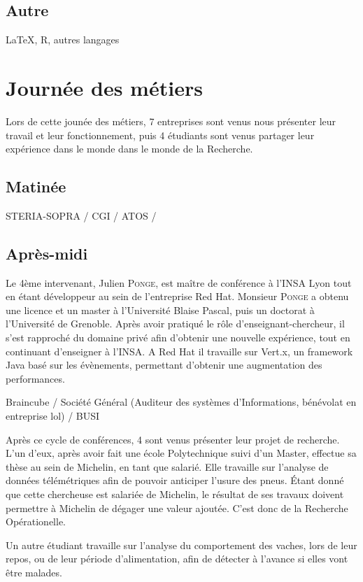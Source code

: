 \documentclass[14pt, a4paper]{report}
\begin{document}
  \section{Autre}

  \LaTeX , R, autres langages

\chapter{Journée des métiers}



Lors de cette jounée des métiers, 7 entreprises sont venus nous présenter leur travail et leur fonctionnement, puis 4 étudiants sont venus partager leur expérience dans le monde dans le monde de la Recherche.

\section{Matinée}

STERIA-SOPRA / CGI / ATOS / 

\section{Après-midi}

Le 4ème intervenant, Julien \textsc{Ponge}, est maître de conférence à l'INSA Lyon tout en étant développeur au sein de l'entreprise Red Hat. Monsieur \textsc{Ponge} a obtenu une licence et un master à l'Université Blaise Pascal, puis un doctorat à l'Université de Grenoble. Après avoir pratiqué le rôle d'enseignant-chercheur, il s'est rapproché du domaine privé afin d'obtenir une nouvelle expérience, tout en continuant d'enseigner à l'INSA. A Red Hat il travaille sur Vert.x, un framework Java basé sur les évènements, permettant d'obtenir une augmentation des performances.


Braincube / Société Général (Auditeur des systèmes d'Informations, bénévolat en entreprise lol) / BUSI

Après ce cycle de conférences, 4 sont venus présenter leur projet de recherche.
L'un d'eux, après avoir fait une école Polytechnique suivi d'un Master, effectue sa thèse au sein de Michelin, en tant que salarié. Elle travaille sur l'analyse de données télémétriques afin de pouvoir anticiper l'usure des pneus. Étant donné que cette chercheuse est salariée de Michelin, le résultat de ses travaux doivent permettre à Michelin de dégager une valeur ajoutée. C'est donc de la Recherche Opérationelle.


Un autre étudiant travaille sur l'analyse du comportement des vaches, lors de leur repos, ou de leur période d'alimentation, afin de détecter à l'avance si elles vont être malades.
\end{document}
